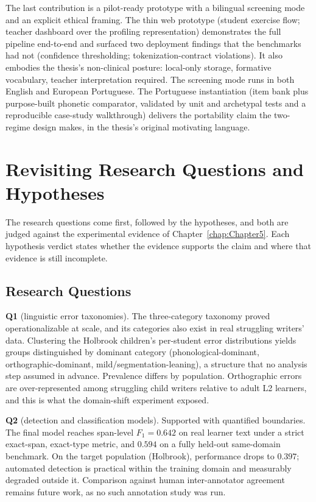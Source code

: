 The last contribution is a pilot-ready prototype with a bilingual screening mode and an explicit ethical framing. The thin web prototype (student exercise flow; teacher dashboard over the profiling representation) demonstrates the full pipeline end-to-end and surfaced two deployment findings that the benchmarks had not (confidence thresholding; tokenization-contract violations). It also embodies the thesis's non-clinical posture: local-only storage, formative vocabulary, teacher interpretation required. The screening mode runs in both English and European Portuguese. The Portuguese instantiation (item bank plus purpose-built phonetic comparator, validated by unit and archetypal tests and a reproducible case-study walkthrough) delivers the portability claim the two-regime design makes, in the thesis's original motivating language.

\section{Revisiting Research Questions and Hypotheses}
\label{sec:concl_rq}

The research questions come first, followed by the hypotheses, and both are judged against the experimental evidence of Chapter~\ref{chap:Chapter5}. Each hypothesis verdict states whether the evidence supports the claim and where that evidence is still incomplete.

\subsection{Research Questions}
\label{sec:concl_rq_questions}

\textbf{Q1} (linguistic error taxonomies). The three-category taxonomy proved operationalizable at scale, and its categories also exist in real struggling writers' data. Clustering the Holbrook children's per-student error distributions yields groups distinguished by dominant category (phonological-dominant, orthographic-dominant, mild/segmentation-leaning), a structure that no analysis step assumed in advance. Prevalence differs by population. Orthographic errors are over-represented among struggling child writers relative to adult L2 learners, and this is what the domain-shift experiment exposed.

\textbf{Q2} (detection and classification models). Supported with quantified boundaries. The final model reaches span-level $F_1 = 0.642$ on real learner text under a strict exact-span, exact-type metric, and $0.594$ on a fully held-out same-domain benchmark. On the target population (Holbrook), performance drops to $0.397$; automated detection is practical within the training domain and measurably degraded outside it. Comparison against human inter-annotator agreement remains future work, as no such annotation study was run.

